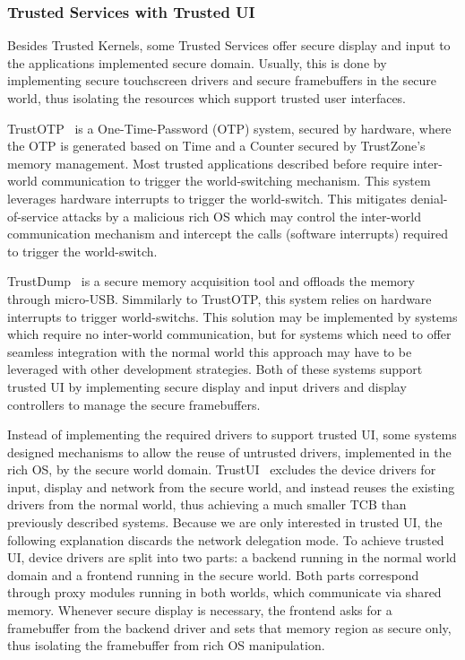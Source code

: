 \subsubsection{Trusted Services with Trusted UI}

Besides Trusted Kernels, some Trusted Services offer secure display and input to the applications implemented secure domain. Usually, this is done by implementing secure touchscreen drivers and secure framebuffers in the secure world, thus isolating the resources which support trusted user interfaces.

TrustOTP~\cite{sun2015trustotp} is a One-Time-Password (OTP) system, secured by hardware, where the OTP is generated based on Time and a Counter secured by TrustZone's memory management. Most trusted applications described before require inter-world communication to trigger the world-switching mechanism. This system leverages hardware interrupts to trigger the world-switch. This mitigates denial-of-service attacks by a malicious rich OS which may control the inter-world communication mechanism and intercept the calls (software interrupts) required to trigger the world-switch. 

TrustDump~\cite{sun2015reliable} is a secure memory acquisition tool and offloads the memory through micro-USB. Simmilarly to TrustOTP, this system relies on hardware interrupts to trigger world-switchs. This solution may be implemented by systems which require no inter-world communication, but for systems which need to offer seamless integration with the normal world this approach may have to be leveraged with other development strategies. Both of these systems support trusted UI by implementing secure display and input drivers and display controllers to manage the secure framebuffers.

Instead of implementing the required drivers to support trusted UI, some systems designed mechanisms to allow the reuse of untrusted drivers, implemented in the rich OS, by the secure world domain.
TrustUI~\cite{li2014building} excludes the device drivers for input, display and network from the secure world, and instead reuses the existing drivers from the normal world, thus achieving a much smaller TCB than previously described systems. Because we are only interested in trusted UI, the following explanation discards the network delegation mode. To achieve trusted UI, device drivers are split into two parts: a backend running in the normal world domain and a frontend running in the secure world. Both parts correspond through proxy modules running in both worlds, which communicate via shared memory. Whenever secure display is necessary, the frontend asks for a framebuffer from the backend driver and sets that memory region as secure only, thus isolating the framebuffer from rich OS manipulation. 

